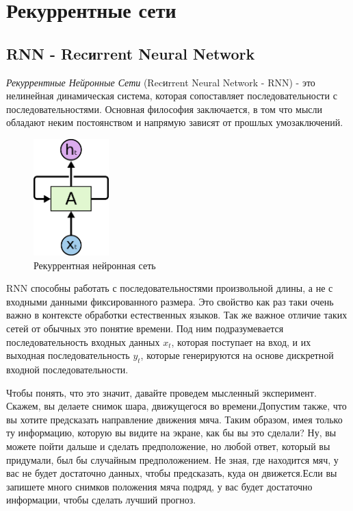 	\clearpage
	
	\section{Рекуррентные сети}
	
	\subsection{RNN - Recиrrent Neural Network}
	
	\textit{Рекуррентные Нейронные Сети} (Recиrrent Neural Network - RNN) - это нелинейная динамическая система, которая сопоставляет последовательности с последовательностями. Основная философия заключается, в том что мысли обладают неким постоянством и напрямую зависят от прошлых умозаключений. 
	
	\begin{figure}
		\centering
		\captionsetup{justification=centering}
		\includegraphics[height=45mm]{img/2.png}
		\caption{Рекуррентная нейронная сеть}
	\end{figure}
	
	RNN способны работать с последовательностями произвольной длины, а не с входными данными фиксированного размера. Это свойство как раз таки очень важно в контексте обработки естественных языков. Так же важное отличие таких сетей от обычных это понятие времени. Под ним подразумевается последовательность входных данных $x_t$, которая поступает на вход, и их выходная последовательность $y_t$, которые генерируются на основе дискретной входной последовательности. 
	
	Чтобы понять, что это значит, давайте проведем мысленный эксперимент. Скажем, вы делаете снимок шара, движущегося во времени.Допустим также, что вы хотите предсказать направление движения мяча. Таким образом, имея только ту информацию, которую вы видите на экране, как бы вы это сделали? Ну, вы можете пойти дальше и сделать предположение, но любой ответ, который вы придумали, был бы случайным предположением. Не зная, где находится мяч, у вас не будет достаточно данных, чтобы предсказать, куда он движется.Если вы запишете много снимков положения мяча подряд, у вас будет достаточно информации, чтобы сделать лучший прогноз.
	
